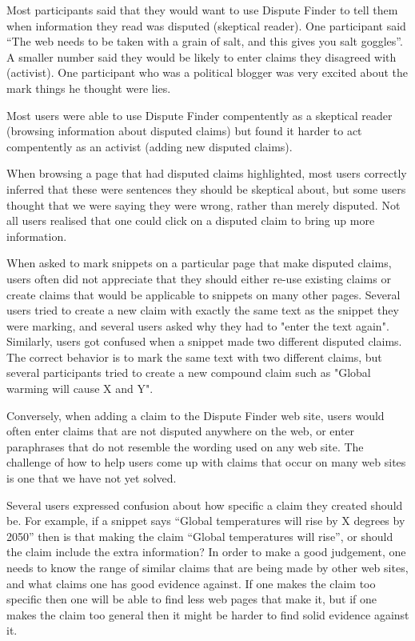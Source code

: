 \documentclass{www2010-submission}
\begin{document}
Most participants said that they would want to use Dispute Finder to tell them when information they read was disputed (skeptical reader). One participant said ``The web needs to be taken with a grain of salt, and this gives you salt goggles''. A smaller number said they would be likely to enter claims they disagreed with (activist). One participant who was a political blogger was very excited about the mark things he thought were lies.

Most users were able to use Dispute Finder compentently as a skeptical reader (browsing information about disputed claims) but found it harder to act compentently as an activist (adding new disputed claims).

When browsing a page that had disputed claims highlighted, most users correctly inferred that these were sentences they should be skeptical about, but some users thought that we were saying they were wrong, rather than merely disputed. Not all users realised that one could click on a disputed claim to bring up more information.

%

When asked to mark snippets on a particular page that make disputed claims, users often did not appreciate that they should either re-use existing claims or create claims that would be applicable to snippets on many other pages. Several users tried to create a new claim with exactly the same text as the snippet they were marking, and several users asked why they had to "enter the text again". Similarly, users got confused when a snippet made two different disputed claims. The correct behavior is to mark the same text with two different claims, but several participants tried to create a new compound claim such as "Global warming will cause X and Y". 

Conversely, when adding a claim to the Dispute Finder web site, users would often enter claims that are not disputed anywhere on the web, or enter paraphrases that do not resemble the wording used on any web site. The challenge of how to help users come up with claims that occur on many web sites is one that we have not yet solved.

Several users expressed confusion about how specific a claim they created should be. For example, if a snippet says ``Global temperatures will rise by X degrees by 2050'' then is that making the claim ``Global temperatures will rise'', or should the claim include the extra information? In order to make a good judgement, one needs to know the range of similar claims that are being made by other web sites, and what claims one has good evidence against. If one makes the claim too specific then one will be able to find less web pages that make it, but if one makes the claim too general then it might be harder to find solid evidence against it.
\end{document}
